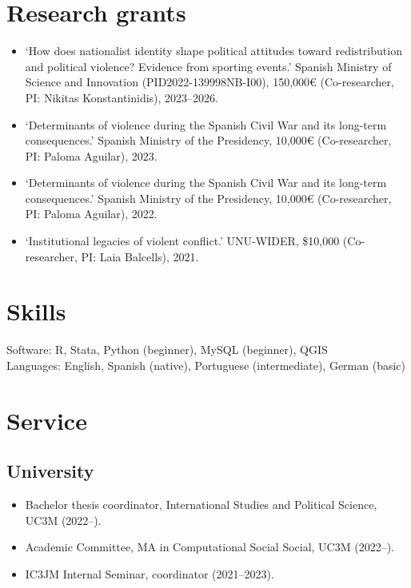 \documentclass[a4paper, 12pt]{article}
\begin{document}
\section*{Research grants}

\begin{itemize}[leftmargin=12pt, itemsep=0pt]
	\item `How does nationalist identity shape political attitudes toward redistribution and political violence? Evidence from sporting events.' Spanish Ministry of Science and Innovation (PID2022-139998NB-I00), 150,000€ (Co-researcher, PI: Nikitas Konstantinidis), 2023--2026.
	\item `Determinants of violence during the Spanish Civil War and its long-term consequences.' Spanish Ministry of the Presidency, 10,000€ (Co-researcher, PI: Paloma Aguilar), 2023.
	\item `Determinants of violence during the Spanish Civil War and its long-term consequences.' Spanish Ministry of the Presidency, 10,000€ (Co-researcher, PI: Paloma Aguilar), 2022.
	\item `Institutional legacies of violent conflict.' UNU-WIDER, \$10,000 (Co-researcher, PI: Laia Balcells), 2021.
\end{itemize}


\vspace{-10pt}
\section*{Skills}

Software: R, Stata, Python (beginner), MySQL (beginner), QGIS\\
Languages: English, Spanish (native), Portuguese (intermediate), German (basic)

\vspace{-10pt}
\section*{Service}

\subsection*{University}

\begin{itemize}[leftmargin=12pt, itemsep=0pt]
  \item Bachelor thesis coordinator, International Studies and Political Science, UC3M (2022--).
	\item Academic Committee, MA in Computational Social Social, UC3M (2022--).
	\item IC3JM Internal Seminar, coordinator (2021--2023).
\end{itemize}
\end{document}
